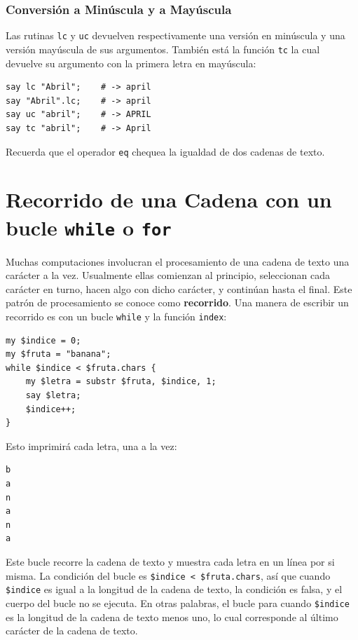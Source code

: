 \subsubsection{Conversión a Minúscula y a Mayúscula}

Las rutinas {\tt lc} y {\tt uc} devuelven respectivamente
una versión en minúscula y una versión mayúscula de sus 
argumentos. También está la función {\tt tc} la cual devuelve
su argumento con la primera letra en mayúscula:

\begin{lstlisting}
say lc "Abril";    # -> april
say "Abril".lc;    # -> april
say uc "abril";    # -> APRIL
say tc "abril";    # -> April
\end{lstlisting}

Recuerda que el operador {\tt eq} chequea la igualdad de dos 
cadenas de texto.

\section{Recorrido de una Cadena con un bucle {\tt while} o {\tt for}}
\label{stringtraversal}

Muchas computaciones involucran el procesamiento de una
cadena de texto una carácter a la vez. Usualmente ellas
comienzan al principio, seleccionan cada carácter en turno,
hacen algo con dicho carácter, y continúan hasta el final.
Este patrón de procesamiento se conoce como {\bf recorrido}. 
Una manera de escribir un recorrido es con un bucle {\tt while}
y la función {\tt index}:

\begin{lstlisting}
my $indice = 0;
my $fruta = "banana";
while $indice < $fruta.chars { 
    my $letra = substr $fruta, $indice, 1; 
    say $letra; 
    $indice++;
}
\end{lstlisting}
%

Esto imprimirá cada letra, una a la vez:
\begin{lstlisting}
b
a
n
a
n
a
\end{lstlisting}
%
Este bucle recorre la cadena de texto y muestra cada letra
en un línea por si misma. La condición del bucle es 
{\tt \$indice < \$fruta.chars},
así que cuando {\tt \$indice} es igual a la longitud de
la cadena de texto, la condición es falsa, y el cuerpo del
bucle no se ejecuta. En otras palabras, el bucle para cuando
{\tt \$indice} es la longitud de la cadena de texto menos 
uno, lo cual corresponde al último carácter de la cadena 
de texto.

